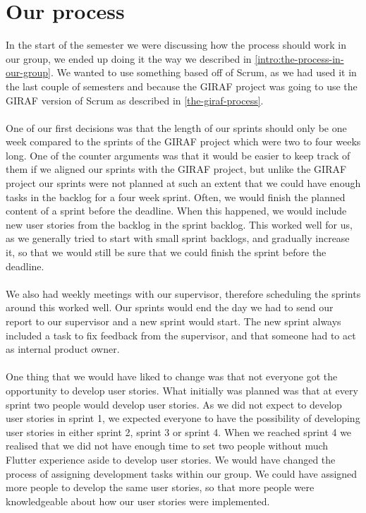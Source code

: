 \section{Our process}
In the start of the semester we were discussing how the process should work in our group, we ended up doing it the way we described in \autoref{intro:the-process-in-our-group}.
We wanted to use something based off of Scrum, as we had used it in the last couple of semesters and because the GIRAF project was going to use the GIRAF version of Scrum as described in \autoref{the-giraf-process}.
\\\\
One of our first decisions was that the length of our sprints should only be one week compared to the sprints of the GIRAF project which were two to four weeks long.
One of the counter arguments was that it would be easier to keep track of them if we aligned our sprints with the GIRAF project, but unlike the GIRAF project our sprints were not planned at such an extent that we could have enough tasks in the backlog for a four week sprint.
Often, we would finish the planned content of a sprint before the deadline.
When this happened, we would include new user stories from the backlog in the sprint backlog. 
This worked well for us, as we generally tried to start with small sprint backlogs, and gradually increase it, so that we would still be sure that we could finish the sprint before the deadline.
\\\\
We also had weekly meetings with our supervisor, therefore scheduling the sprints around this worked well.
Our sprints would end the day we had to send our report to our supervisor and a new sprint would start.
The new sprint always included a task to fix feedback from the supervisor, and that someone had to act as internal product owner.
\\\\
One thing that we would have liked to change was that not everyone got the opportunity to develop user stories.
What initially was planned was that at every sprint two people would develop user stories.
As we did not expect to develop user stories in sprint 1, we expected everyone to have the possibility of developing user stories in either sprint 2, sprint 3 or sprint 4.
When we reached sprint 4 we realised that we did not have enough time to set two people without much Flutter experience aside to develop user stories.
We would have changed the process of assigning development tasks within our group.
We could have assigned more people to develop the same user stories, so that more people were knowledgeable about how our user stories were implemented. 
